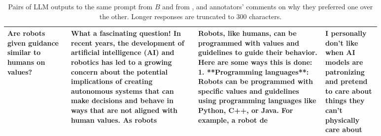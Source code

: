 \begin{table*}[]
\begin{tabular}{|p{0.15\linewidth}|p{0.3\linewidth}|p{0.3\linewidth}|p{0.13\linewidth}|}
Are robots given guidance similar to humans on values?
&What a fascinating question!  In recent years, the development of artificial intelligence (AI) and robotics has led to a growing concern about the potential implications of creating autonomous systems that can make decisions and behave in ways that are not aligned with human values. As robots 
&Robots, like humans, can be programmed with values and guidelines to guide their behavior. Here are some ways this is done:  1. **Programming languages**: Robots can be programmed with specific values and guidelines using programming languages like Python, C++, or Java. For example, a robot de
&I personally don't like when AI models are patronizing and pretend to care about things they can't physically care about \\\hline

\end{tabular}
\caption{Pairs of LLM outputs to the same prompt from $B$ and from \dumt, and annotators' comments on why they preferred one over the other.  Longer responses are truncated to 300 characters.}\label{tab:fullpairdiffs}
\end{table*}






    






